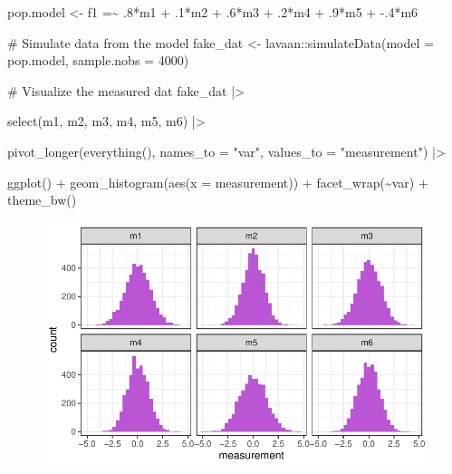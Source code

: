 \documentclass[
  letterpaper,
  DIV=11,
  numbers=noendperiod]{scrreprt}
\newenvironment{Shaded}{\begin{snugshade}}{\end{snugshade}}
\newcommand{\AttributeTok}[1]{\textcolor[rgb]{0.40,0.45,0.13}{#1}}
\newcommand{\CommentTok}[1]{\textcolor[rgb]{0.37,0.37,0.37}{#1}}
\newcommand{\DecValTok}[1]{\textcolor[rgb]{0.68,0.00,0.00}{#1}}
\newcommand{\FunctionTok}[1]{\textcolor[rgb]{0.28,0.35,0.67}{#1}}
\newcommand{\NormalTok}[1]{\textcolor[rgb]{0.00,0.23,0.31}{#1}}
\newcommand{\OtherTok}[1]{\textcolor[rgb]{0.00,0.23,0.31}{#1}}
\newcommand{\SpecialCharTok}[1]{\textcolor[rgb]{0.37,0.37,0.37}{#1}}
\newcommand{\StringTok}[1]{\textcolor[rgb]{0.13,0.47,0.30}{#1}}
\begin{document}
\begin{Shaded}
\begin{Highlighting}[]
\NormalTok{pop.model }\OtherTok{\textless{}{-}} \StringTok{\textquotesingle{} }
\StringTok{  f1 =\textasciitilde{} .8*m1 + .1*m2 + .6*m3 + .2*m4 + .9*m5 + {-}.4*m6}
\StringTok{\textquotesingle{}}

\CommentTok{\# Simulate data from the model}
\NormalTok{fake\_dat }\OtherTok{\textless{}{-}}\NormalTok{ lavaan}\SpecialCharTok{::}\FunctionTok{simulateData}\NormalTok{(}\AttributeTok{model =}\NormalTok{ pop.model, }\AttributeTok{sample.nobs =} \DecValTok{4000}\NormalTok{)}

\CommentTok{\# Visualize the measured dat}
\NormalTok{fake\_dat }\SpecialCharTok{|\textgreater{}}

  \FunctionTok{select}\NormalTok{(m1, m2, m3, m4, m5, m6) }\SpecialCharTok{|\textgreater{}}
  
  \FunctionTok{pivot\_longer}\NormalTok{(}\FunctionTok{everything}\NormalTok{(), }\AttributeTok{names\_to =} \StringTok{"var"}\NormalTok{, }\AttributeTok{values\_to =} \StringTok{"measurement"}\NormalTok{) }\SpecialCharTok{|\textgreater{}}

  \FunctionTok{ggplot}\NormalTok{() }\SpecialCharTok{+}
  \FunctionTok{geom\_histogram}\NormalTok{(}\FunctionTok{aes}\NormalTok{(}\AttributeTok{x =}\NormalTok{ measurement)) }\SpecialCharTok{+}
  \FunctionTok{facet\_wrap}\NormalTok{(}\SpecialCharTok{\textasciitilde{}}\NormalTok{var) }\SpecialCharTok{+}
  \FunctionTok{theme\_bw}\NormalTok{()}
\end{Highlighting}
\end{Shaded}

\begin{figure}[H]

{\centering \includegraphics{./bayesian-cfa_files/figure-pdf/sim-1-fac-1.pdf}

}

\end{figure}
\end{document}
